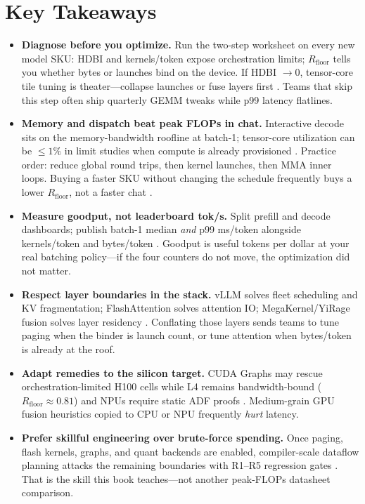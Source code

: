 \section{Key Takeaways}
\begin{itemize}
\item \textbf{Diagnose before you optimize.}
Run the two-step worksheet on every new model SKU: HDBI and kernels/token expose orchestration limits; $R_{\mathrm{floor}}$ tells you whether bytes or launches bind on the device.
If HDBI $\to 0$, tensor-core tile tuning is theater---collapse launches or fuse layers first \citep{taxbreak2026,memoryfloor2026}.
Teams that skip this step often ship quarterly GEMM tweaks while p99 latency flatlines.

\item \textbf{Memory and dispatch beat peak FLOPs in chat.}
Interactive decode sits on the memory-bandwidth roofline at batch-1; tensor-core utilization can be $\leq 1\%$ in limit studies when compute is already provisioned \citep{patel2025llminference,yu2026precisionbottlenec}.
Practice order: reduce global round trips, then kernel launches, then MMA inner loops.
Buying a faster SKU without changing the schedule frequently buys a lower $R_{\mathrm{floor}}$, not a faster chat \citep{memoryfloor2026}.

\item \textbf{Measure goodput, not leaderboard tok/s.}
Split prefill and decode dashboards; publish batch-1 median \emph{and} p99 ms/token alongside kernels/token and bytes/token \citep{kwon2023vllm,chen2026towardshighgoodput,fan2025ellieenergyefficie}.
Goodput is useful tokens per dollar at your real batching policy---if the four counters do not move, the optimization did not matter.

\item \textbf{Respect layer boundaries in the stack.}
vLLM solves fleet scheduling and KV fragmentation; FlashAttention solves attention IO; MegaKernel/YiRage fusion solves layer residency \citep{kwon2023vllm,dao2022flashattention,yirage2026}.
Conflating those layers sends teams to tune paging when the binder is launch count, or tune attention when bytes/token is already at the roof.

\item \textbf{Adapt remedies to the silicon target.}
CUDA Graphs may rescue orchestration-limited H100 cells while L4 remains bandwidth-bound ($R_{\mathrm{floor}}\approx 0.81$) and NPUs require static ADF proofs \citep{memoryfloor2026,amd2024xdna,nvidia2024cudagraphs}.
Medium-grain GPU fusion heuristics copied to CPU or NPU frequently \emph{hurt} latency.

\item \textbf{Prefer skillful engineering over brute-force spending.}
Once paging, flash kernels, graphs, and quant backends are enabled, compiler-scale dataflow planning attacks the remaining boundaries with R1--R5 regression gates \citep{yirage2026,chen2020compilerbasedhardw,arya2024apreliminaryperfor}.
That is the skill this book teaches---not another peak-FLOPs datasheet comparison.
\end{itemize}

